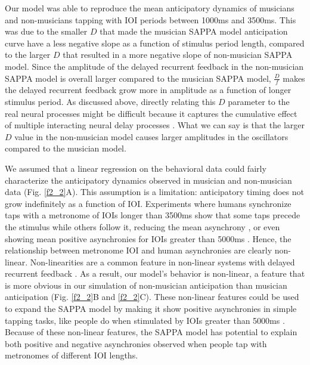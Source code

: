 \documentclass{report}
\begin{document}
Our model was able to reproduce the mean anticipatory dynamics of musicians and non-musicians tapping with IOI periods between 1000ms and 3500ms. This was due to the smaller $D$ that made the musician SAPPA model anticipation curve have a less negative slope as a function of stimulus period length, compared to the larger $D$ that resulted in a more negative slope of non-musician SAPPA model. Since the amplitude of the delayed recurrent feedback in the non-musician SAPPA model is overall larger compared to the musician SAPPA model, $\frac{D}{f}$ makes the delayed recurrent feedback grow more in amplitude as a function of longer stimulus period. As discussed above, directly relating this $D$ parameter to the real neural processes might be difficult because it captures the cumulative effect of multiple interacting neural delay processes \cite{van2003self}. What we can say is that the larger $D$ value in the non-musician model causes larger amplitudes in the oscillators compared to the musician model.

We assumed that a linear regression on the behavioral data could fairly characterize the anticipatory dynamics observed in musician and non-musician data (Fig.{} \ref{f2_2}A). This assumption is a limitation: anticipatory timing does not grow indefinitely as a function of IOI. Experiments where humans synchronize taps with a metronome of IOIs longer than 3500ms show that some taps precede the stimulus while others follow it, reducing the mean asynchrony \cite{baaaath2016estimating}, or even showing mean positive asynchronies for IOIs greater than 5000ms \cite{miyake2004two}. Hence, the relationship between metronome IOI and human asynchronies are clearly non-linear. Non-linearities are a common feature in non-linear systems with delayed recurrent feedback \cite{khalil2002nonlinear}. As a result, our model's behavior is non-linear, a feature that is more obvious in our simulation of non-musician anticipation than musician anticipation (Fig.{} \ref{f2_2}B and \ref{f2_2}C). These non-linear features could be used to expand the SAPPA model by making it show positive asynchronies in simple tapping tasks, like people do when stimulated by IOIs greater than 5000ms \cite{miyake2004two}. Because of these non-linear features, the SAPPA model has potential to explain both positive and negative asynchronies observed when people tap with metronomes of different IOI lengths.
\end{document}
